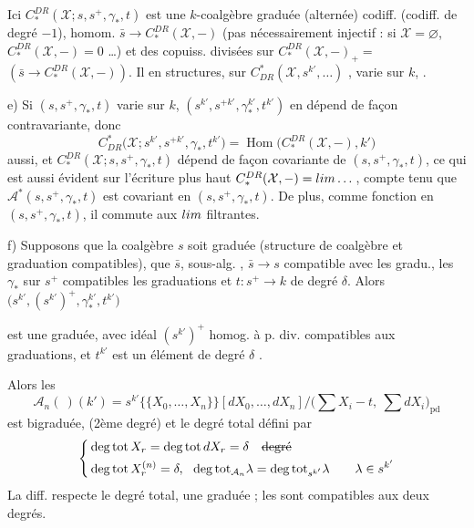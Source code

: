 \documentclass[11pt,a4paper]{article}
\begin{document}
Ici $C^{DR}_*(\mathcal{X};s,s^+,\gamma_*,t)$ est une $k$-coalgèbre graduée
(alternée) codiff. (codiff. de degré $-1$), 
 homom. $\bar s\to C^{DR}_*(\mathcal{X},-)$ (pas
nécessairement injectif : si $\mathcal{X}=\varnothing$,
$C^{DR}_*(\mathcal{X},-)=0$ …) et des copuiss. divisées sur
$C^{DR}_*(\mathcal{X},-)_+=$ \ill{}
$(\bar s\to C^{DR}_*(\mathcal{X},-))$. Il en 
structures, sur $C^*_{DR}(\mathcal{X},s^{k'},\dots)$ ,
\ill{} varie sur $k$, .


e) Si $(s,s^+,\gamma_*,t)$ varie sur $k$,
$(s^{k'},s^{+k'},\gamma_*^{k'},t^{k'})$ en dépend de façon contravariante,
donc
\[
  C^*_{DR}\bigl(\mathcal{X};s^{k'},s^{+k'},\gamma_*,t^{k'}\bigr)
  =\operatorname{Hom}\bigl(C^{DR}_*(\mathcal{X},-),k'\bigr)
\]
aussi, et $C^{DR}_*(\mathcal{X};s,s^+,\gamma_*,t)$ dépend de façon
covariante de $(s,s^+,\gamma_*,t)$, ce qui est aussi évident sur l'écriture
plus haut $C^{DR}_*(\mathcal{X},-)=\varinjlim\dots$, compte tenu que
$\mathcal{A}^*(s,s^+,\gamma_*,t)$ est covariant en $(s,s^+,\gamma_*,t)$.
De plus,  comme fonction en $(s,s^+,\gamma_*,t)$, il commute aux
$\varinjlim$ filtrantes. 

f) Supposons que la coalgèbre $s$ soit graduée (structure de coalgèbre et
graduation compatibles), que $\bar s$, sous-alg. ,
$\bar s\to s$ compatible avec les gradu., les $\gamma_*$  sur
$s^+$ compatibles  les graduations et $t : s^+\to k$ 
de degré $\delta$. Alors  
$\bigl(s^{k'},(s^{k'})^+,\gamma_*^{k'},t^{k'}\bigr)$

est une   graduée, avec idéal $(s^{k'})^+$
homog. à p. div. compatibles aux graduations, et $t^{k'}$ est un élément de
degré $\delta$ .

Alors les
\[
  \mathcal{A}_n(\ )(k')=s^{k'}\{\{X_0,\dots,X_n\}\}[dX_0,\dots,dX_n]
  \big/\bigl(\textstyle\sum X_i-t,\ \sum dX_i\bigr)_{\mathrm{pd}}
\]
est  bigraduée, 
(2ème degré) et le degré total défini par
\[
  \left\{
  \begin{aligned}
    &\deg\mathrm{tot}\,X_r=\deg\mathrm{tot}\,dX_r=\delta
      \quad\text{\struck{degré}}\\
    &\deg\mathrm{tot}\,X_r^{(n)}=\delta,\ \ \deg\mathrm{tot}_{\mathcal{A}_n}\lambda
      =\deg\mathrm{tot}_{s^{k'}}\lambda \qquad \lambda\in s^{k'}
  \end{aligned}\right.
\]
La diff. \struck{\ill{}} respecte le degré total, \ill{} une \ill{} graduée
\ill{}  ; les  sont
compatibles aux deux degrés.
\end{document}
